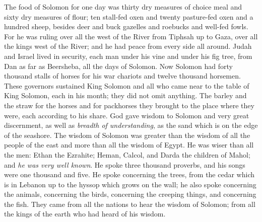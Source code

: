 \begin{biblechapter}
\verse The food of Solomon for one day was thirty dry measures of choice meal and sixty dry measures of flour;
\verse ten stall-fed oxen and twenty pasture-fed oxen and a hundred sheep, besides deer and buck gazelles and roebucks and well-fed fowls.
\verse For he was ruling over all the west of the River from Tiphsah up to Gaza, over all the kings west of the River; and he had peace from every side all around.
\verse Judah and Israel lived in security, each man under his vine and under his fig tree, from Dan as far as Beersheba, all the days of Solomon.
\verse Now Solomon had forty thousand stalls of horses for his war chariots and twelve thousand horsemen.
\verse These governors sustained King Solomon and all who came near to the table of King Solomon, each in his month; they did not omit anything.
\verse The barley and the straw for the horses and for packhorses they brought to the place where they were, each according to his share.
 God gave wisdom to Solomon and very great discernment, as well as \textit{breadth of understanding}, as the sand which is on the edge of the seashore.
\verse The wisdom of Solomon was greater than the wisdom of all the people of the east and more than all the wisdom of Egypt.
\verse He was wiser than all the men: Ethan the Ezrahite; Heman, Calcol, and Darda the children of Mahol; and \textit{he was very well known}.
\verse He spoke three thousand proverbs, and his songs were one thousand and five.
\verse He spoke concerning the trees, from the cedar which is in Lebanon up to the hyssop which grows on the wall; he also spoke concerning the animals, concerning the birds, concerning the creeping things, and concerning the fish.
\verse They came from all the nations to hear the wisdom of Solomon; from all the kings of the earth who had heard of his wisdom.
\end{biblechapter}

